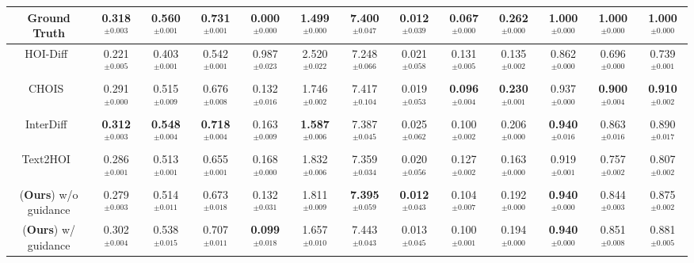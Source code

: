 \begin{table}
{\begin{tabular}{@{}ccccccccccccc@{}}
        Ground Truth &
         0.318$^{\pm0.003}$ & 0.560$^{\pm0.001}$ & 0.731$^{\pm0.001}$ & 0.000$^{\pm0.000}$ & 1.499$^{\pm0.000}$ & 7.400$^{\pm0.047}$ & 0.012$^{\pm0.039}$ & 0.067$^{\pm0.000}$ & 0.262$^{\pm0.000}$ & 1.000$^{\pm0.000}$ & 1.000$^{\pm0.000}$ & 1.000$^{\pm0.000}$ \\
        \midrule
        HOI-Diff~\cite{peng2023hoi} &
        0.221$^{\pm0.005}$ & 0.403$^{\pm0.001}$ & 0.542$^{\pm0.001}$ & 0.987$^{\pm0.023}$ & 2.520$^{\pm0.022}$ & 7.248$^{\pm0.066}$ & 0.021$^{\pm0.058}$ & 0.131$^{\pm0.005}$ & 0.135$^{\pm0.002}$ & 0.862$^{\pm0.000}$ & 0.696$^{\pm0.000}$ & 0.739$^{\pm0.001}$\\
        CHOIS~\cite{li2023controllable} &
        0.291$^{\pm0.000}$ & 0.515$^{\pm0.009}$ & 0.676$^{\pm0.008}$ & 0.132$^{\pm0.016}$ & 1.746$^{\pm0.002}$ & 7.417$^{\pm0.104}$ & 0.019$^{\pm0.053}$ & \textbf{0.096}$^{\pm0.004}$ & \textbf{0.230}$^{\pm0.001}$ & 0.937$^{\pm0.000}$ & \textbf{0.900}$^{\pm0.004}$ & \textbf{0.910}$^{\pm0.002}$\\
        InterDiff~\cite{xu2023interdiff} &
        \textbf{0.312}$^{\pm0.003}$ & \textbf{0.548}$^{\pm0.004}$ & \textbf{0.718}$^{\pm0.004}$ & 0.163$^{\pm0.009}$ & \textbf{1.587}$^{\pm0.006}$ & 7.387$^{\pm0.045}$ & 0.025$^{\pm0.062}$ & 0.100$^{\pm0.002}$ & 0.206$^{\pm0.000}$ & \textbf{0.940}$^{\pm0.016}$ & 0.863$^{\pm0.016}$ & 0.890$^{\pm0.017}$\\
        Text2HOI~\cite{cha2024text2hoi} &
        0.286$^{\pm0.001}$ & 0.513$^{\pm0.001}$ & 0.655$^{\pm0.001}$ & 0.168$^{\pm0.000}$ & 1.832$^{\pm0.006}$ & 7.359$^{\pm0.034}$ & 0.020$^{\pm0.056}$ & 0.127$^{\pm0.002}$ & 0.163$^{\pm0.000}$ & 0.919$^{\pm0.001}$ & 0.757$^{\pm0.002}$ & 0.807$^{\pm0.002}$\\
        \ours{}(\textbf{Ours}) w/o guidance &
         0.279$^{\pm0.003}$ & 0.514$^{\pm0.011}$ & 0.673$^{\pm0.018}$ & 0.132$^{\pm0.031}$ & 1.811$^{\pm0.009}$ & \textbf{7.395}$^{\pm0.059}$ & \textbf{0.012}$^{\pm0.043}$ & 0.104$^{\pm0.007}$ & 0.192$^{\pm0.000}$ & \textbf{0.940}$^{\pm0.000}$ & 0.844$^{\pm0.003}$ & 0.875$^{\pm0.002}$\\
        \ours{}(\textbf{Ours}) w/ guidance &
          0.302$^{\pm0.004}$ & 0.538$^{\pm0.015}$ & 0.707$^{\pm0.011}$ & \textbf{0.099}$^{\pm0.018}$ & 1.657$^{\pm0.010}$ & 7.443$^{\pm0.043}$ & 0.013$^{\pm0.045}$ & 0.100$^{\pm0.001}$ & 0.194$^{\pm0.000}$ & \textbf{0.940}$^{\pm0.000}$ & 0.851$^{\pm0.008}$ & 0.881$^{\pm0.005}$\\
        \bottomrule
    \end{tabular}}%
\end{table}
